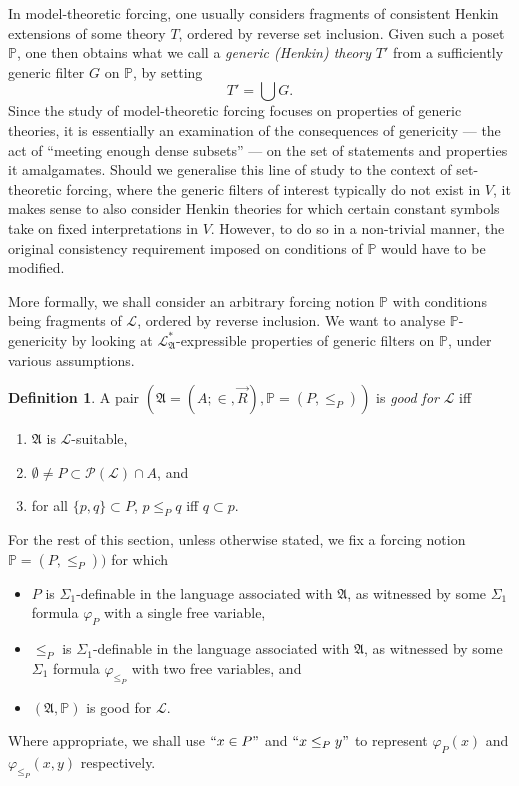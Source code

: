 \documentclass[12pt, twoside]{memoir}
\numberwithin{equation}{section}
\theoremstyle{definition}
\newtheorem{defi}[thm]{Definition}
\theoremstyle{remark}
\theoremstyle{definition}
\theoremstyle{definition}
\theoremstyle{definition}
\theoremstyle{remark}
\begin{document}
In model-theoretic forcing, one usually considers fragments of consistent Henkin extensions of some theory $T$, ordered by reverse set inclusion. Given such a poset $\mathbb{P}$, one then obtains what we call a \textit{generic (Henkin) theory} $T'$ from a sufficiently generic filter $G$ on $\mathbb{P}$, by setting $$T' = \bigcup G \text{.}$$ Since the study of model-theoretic forcing focuses on properties of generic theories, it is essentially an examination of the consequences of genericity --- the act of ``meeting enough dense subsets'' --- on the set of statements and properties it amalgamates. Should we generalise this line of study to the context of set-theoretic forcing, where the generic filters of interest typically do not exist in $V$, it makes sense to also consider Henkin theories for which certain constant symbols take on fixed interpretations in $V$. However, to do so in a non-trivial manner, the original consistency requirement imposed on conditions of $\mathbb{P}$ would have to be modified.

More formally, we shall consider an arbitrary forcing notion $\mathbb{P}$ with conditions being fragments of $\mathcal{L}$, ordered by reverse inclusion. We want to analyse $\mathbb{P}$-genericity by looking at $\mathcal{L}^{*}_{\mathfrak{A}}$-expressible properties of generic filters on $\mathbb{P}$, under various assumptions.

\begin{defi}
A pair $(\mathfrak{A} = (A; \in, \Vec{R}), \mathbb{P} = (P, \leq_P))$ is \emph{good for} $\mathcal{L}$ iff 
\begin{enumerate}[label=(\alph*)]
    \item $\mathfrak{A}$ is $\mathcal{L}$-suitable,
    \item $\emptyset \neq P \subset \mathcal{P}(\mathcal{L}) \cap A$, and
    \item for all $\{p, q\} \subset P$, $p \leq_P q$ iff $q \subset p$.
\end{enumerate}
\end{defi}

For the rest of this section, unless otherwise stated, we fix a forcing notion $\mathbb{P} = (P, \leq_P))$ for which
\begin{itemize}
    \item $P$ is $\Sigma_1$-definable in the language associated with $\mathfrak{A}$, as witnessed by some $\Sigma_1$ formula $\varphi_{P}$ with a single free variable,
    \item $\leq_P$ is $\Sigma_1$-definable in the language associated with $\mathfrak{A}$, as witnessed by some $\Sigma_1$ formula $\varphi_{\leq_P}$ with two free variables, and
    \item $(\mathfrak{A}, \mathbb{P})$ is good for $\mathcal{L}$.
\end{itemize}
Where appropriate, we shall use $``x \in P"$ and $``x \leq_P y"$ to represent $\varphi_{P}(x)$ and $\varphi_{\leq_P}(x, y)$ respectively.
\end{document}
